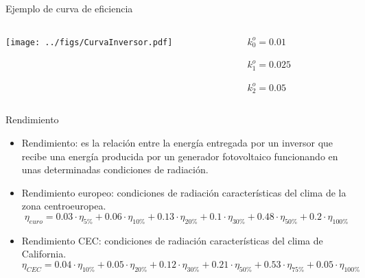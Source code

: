 \documentclass[aspectratio=169, usenames,svgnames,dvipsnames]{beamer}
\begin{document}
\begin{frame}[label={sec:org97b3abe}]{Ejemplo de curva de eficiencia}
\begin{columns}
\begin{column}{0.8\columnwidth}
\begin{center}
\texttt{[image: ../figs/CurvaInversor.pdf]}
\end{center}
\end{column}
\begin{column}{0.2\columnwidth}
\(k_{0}^{o}=0.01\)

\(k_{1}^{o}=0.025\)

\(k_{2}^{o}=0.05\)
\end{column}
\end{columns}
\end{frame}
\begin{frame}[label={sec:org10a8cb5}]{Rendimiento}
\begin{itemize}
\item \alert{Rendimiento}: es la relación entre la energía entregada por
un inversor que recibe una energía producida por un generador
fotovoltaico funcionando en unas determinadas condiciones de radiación.

\item \alert{Rendimiento europeo}: condiciones de radiación características del
clima de la zona centroeuropea.
\[
  \eta_{euro} = 0.03 \cdot \eta_{5\%}  +  0.06 \cdot \eta_{10\%}  +  0.13 \cdot \eta_{20\%}  +  0.1 \cdot \eta_{30\%}  +  0.48 \cdot \eta_{50\%}  +  0.2 \cdot \eta_{100\%}
\]
\item \alert{Rendimiento CEC}: condiciones de radiación características del clima de
California.
\[
  \eta_{CEC} = 0.04 \cdot \eta_{10\%}  +  0.05 \cdot \eta_{20\%}  +  0.12 \cdot \eta_{30\%}  +  0.21 \cdot \eta_{50\%} + 0.53 \cdot \eta_{75\%}  +  0.05 \cdot \eta_{100\%}
\]
\end{itemize}
\end{frame}
\end{document}
